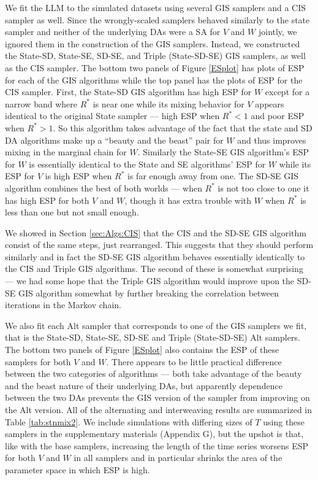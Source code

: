 \documentclass[12pt]{article}
\begin{document}
We fit the LLM to the simulated datasets using several GIS samplers and a CIS sampler as well. Since the wrongly-scaled samplers behaved similarly to the state sampler and neither of the underlying DAs were a SA for $V$ and $W$ jointly, we ignored them in the construction of the GIS samplers. Instead, we constructed the State-SD, State-SE, SD-SE, and Triple (State-SD-SE) GIS samplers, as well as the CIS sampler. The bottom two panels of Figure \ref{ESplot} has plots of ESP for each of the GIS algorithms while the top panel has the plots of ESP for the CIS sampler. First, the State-SD GIS algorithm has high ESP for $W$ except for a narrow band where $R^*$ is near one while its mixing behavior for $V$ appears identical to the original State sampler --- high ESP when $R^* < 1$ and poor ESP when $R^* > 1$. So this algorithm takes advantage of the fact that the state and SD DA algorithms make up a ``beauty and the beast'' pair for $W$ and thus improves mixing in the marginal chain for $W$. Similarly the State-SE GIS algorithm's ESP for $W$ is essentially identical to the State and SE algorithms' ESP for $W$ while its ESP for $V$ is high ESP when $R^*$ is far enough away from one. The SD-SE GIS algorithm combines the best of both worlds --- when $R^*$ is not too close to one it has high ESP for both $V$ and $W$, though it has extra trouble with $W$ when $R^*$ is less than one but not small enough. 

We showed in Section \ref{sec:Algs:CIS} that the CIS and the SD-SE GIS algorithm consist of the same steps, just rearranged. This suggests that they should perform similarly and in fact the SD-SE GIS algorithm behaves essentially identically to the CIS and Triple GIS algorithms. The second of these is somewhat surprising --- we had some hope that the Triple GIS algorithm would improve upon the SD-SE GIS algorithm somewhat by further breaking the correlation between iterations in the Markov chain.

We also fit each Alt sampler that corresponds to one of the GIS samplers we fit, that is the State-SD, State-SE, SD-SE and Triple (State-SD-SE) Alt samplers. The bottom two panels of Figure \ref{ESplot} also contains the ESP of these samplers for both $V$ and $W$. There appears to be little practical difference between the two categories of algorithms --- both take advantage of the beauty and the beast nature of their underlying DAs, but apparently dependence between the two DAs prevents the GIS version of the sampler from improving on the Alt version. All of the alternating and interweaving results are summarized in Table \ref{tab:stnmix2}. We include simulations with differing sizes of $T$ using these samplers in the supplementary materials (Appendix G), but the upshot is that, like with the base samplers, increasing the length of the time series worsens ESP for both $V$ and $W$ in all samplers and in particular shrinks the area of the parameter space in which ESP is high.
\end{document}
